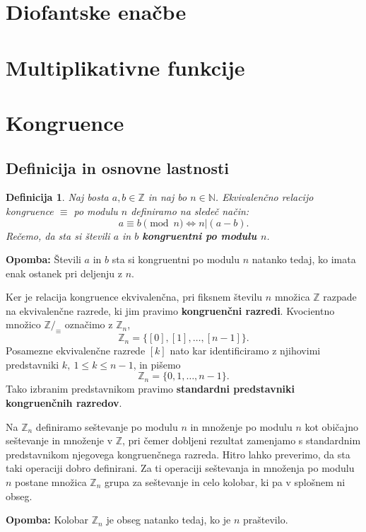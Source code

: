 \documentclass[12pt, a4paper]{article}
\newtheorem{defi}{Definicija}
\newenvironment{opom}[1][]{\par\medskip\noindent \textbf{Opomba: }}{\medskip}
\begin{document}
\section{Diofantske enačbe}
\section{Multiplikativne funkcije}
\section{Kongruence} \label{kongruence}

\subsection{Definicija in osnovne lastnosti}

\begin{defi}
Naj bosta $a,b\in \mathbb{Z}$ in naj bo $n \in \mathbb{N}$. Ekvivalenčno relacijo kongruence $\equiv$ po modulu $n$ definiramo na sledeč način:
$$a\equiv b \pmod n \iff n|(a-b).$$
Rečemo, da sta si števili $a$ in $b$ \textbf{kongruentni po modulu $n$}.
\end{defi}

\begin{opom}
Števili $a$ in $b$ sta si kongruentni po modulu $n$ natanko tedaj, ko imata enak ostanek pri deljenju z $n$.
\end{opom}

Ker je relacija kongruence ekvivalenčna, pri fiksnem številu $n$ množica $\mathbb{Z}$ razpade na ekvivalenčne razrede, ki jim pravimo \textbf{kongruenčni razredi}. Kvocientno množico $\mathbb{Z}/_{\equiv}$ označimo z $\mathbb{Z}_{n}$,
$$\mathbb{Z}_{n} = \{[0], [1],\dots,[n-1]\}.$$
Posamezne ekvivalenčne razrede $[k]$ nato kar identificiramo z njihovimi predstavniki $k, \ 1\leq k \leq n-1$, in pišemo
$$\mathbb{Z}_{n} = \{0, 1,\dots,n-1\}.$$
Tako izbranim predstavnikom pravimo \textbf{standardni predstavniki kongruenčnih razredov}.

Na $\mathbb{Z}_{n}$ definiramo seštevanje po modulu $n$ in množenje po modulu $n$ kot običajno seštevanje in množenje v $\mathbb{Z}$, pri čemer dobljeni rezultat zamenjamo s standardnim predstavnikom njegovega kongruenčnega razreda. Hitro lahko preverimo, da sta taki operaciji dobro definirani. Za ti operaciji seštevanja in množenja po modulu $n$ postane množica $\mathbb{Z}_{n}$ grupa za seštevanje in celo kolobar, ki pa v splošnem ni obseg.

\begin{opom}
Kolobar $\mathbb{Z}_{n}$ je obseg natanko tedaj, ko je $n$ praštevilo.
\end{opom}
\end{document}
